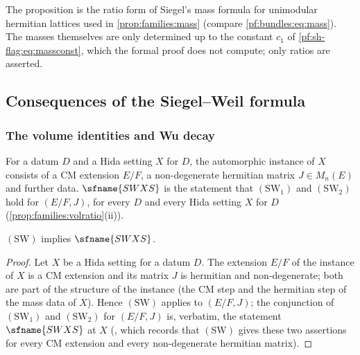 \begin{remark}\label{pf:sh-flag:rem:massratio}
The proposition is the ratio form of Siegel's mass formula for unimodular hermitian lattices
\cite{Siegel1935,Prasad1989,GanHankeYu2001} used in \cref{prop:families:mass} (compare
\eqref{pf:bundles:eq:mass}). The
masses themselves are only determined up to the constant $c_1$ of \eqref{pf:sh-flag:eq:massconst}, which the
formal proof does not compute; only ratios are asserted.
\end{remark}

\subsection{Consequences of the Siegel--Weil formula}\label{sec:pf:sh-flag:sw}

\subsubsection{The volume identities and Wu decay}

\begin{definition}\label{pf:sh-flag:defswxs}
For a datum $D$ and a Hida setting $X$ for $D$, the automorphic instance of $X$ consists of a CM extension
$E/F$, a non-degenerate hermitian matrix $J\in M_n(E)$ and further data. $\sfname{SWXS}$ is the statement that
$(\mathrm{SW}_1)$ and $(\mathrm{SW}_2)$ hold for $(E/F,J)$, for every $D$ and every Hida setting $X$ for $D$
(\cref{prop:families:volratio}(ii)).
\end{definition}

\begin{proposition}\label{pf:sh-flag:swxs}
$(\mathrm{SW})$ implies $\sfname{SWXS}$.
\end{proposition}

\begin{proof}
Let $X$ be a Hida setting for a datum $D$. The extension $E/F$ of the instance of $X$ is a CM extension and its
matrix $J$ is hermitian and non-degenerate; both are part of the structure of the instance (the CM step and the
hermitian step of the mass data of $X$). Hence $(\mathrm{SW})$ applies to $(E/F,J)$; the conjunction of
$(\mathrm{SW}_1)$ and $(\mathrm{SW}_2)$ for $(E/F,J)$ is, verbatim, the statement $\sfname{SWXS}$ at $X$
(, which records that $(\mathrm{SW})$ gives these two assertions for
every CM extension and every non-degenerate hermitian matrix).
\end{proof}

